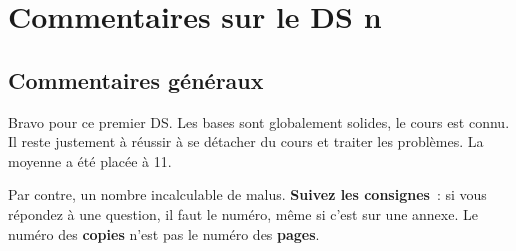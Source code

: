 \documentclass[a4paper, 10pt, final, garamond]{book}
\begin{document}
\setcounter{chapter}{0}

\chapter{Commentaires sur le DS n}


\section{Commentaires généraux}

Bravo pour ce premier DS. Les bases sont globalement solides, le cours est
connu. Il reste justement à réussir à se détacher du cours et traiter les
problèmes. La moyenne a été placée à 11.

Par contre, un nombre incalculable de malus. \textbf{Suivez les consignes}~: si
vous répondez à une question, il faut le numéro, même si c'est sur une annexe.
Le numéro des \textbf{copies} n'est pas le numéro des \textbf{pages}.
\end{document}
